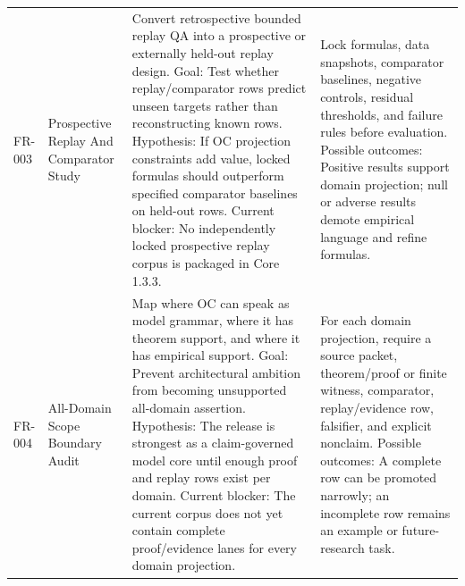 \begin{longtable}{@{}L{0.08\textwidth}L{0.19\textwidth}L{0.28\textwidth}L{0.31\textwidth}@{}}
FR-003 & Prospective Replay And Comparator Study & Convert retrospective bounded replay QA into a prospective or externally held-out replay design. Goal: Test whether replay/comparator rows predict unseen targets rather than reconstructing known rows. Hypothesis: If OC projection constraints add value, locked formulas should outperform specified comparator baselines on held-out rows. Current blocker: No independently locked prospective replay corpus is packaged in Core 1.3.3. & Lock formulas, data snapshots, comparator baselines, negative controls, residual thresholds, and failure rules before evaluation. Possible outcomes: Positive results support domain projection; null or adverse results demote empirical language and refine formulas. \\
FR-004 & All-Domain Scope Boundary Audit & Map where OC can speak as model grammar, where it has theorem support, and where it has empirical support. Goal: Prevent architectural ambition from becoming unsupported all-domain assertion. Hypothesis: The release is strongest as a claim-governed model core until enough proof and replay rows exist per domain. Current blocker: The current corpus does not yet contain complete proof/evidence lanes for every domain projection. & For each domain projection, require a source packet, theorem/proof or finite witness, comparator, replay/evidence row, falsifier, and explicit nonclaim. Possible outcomes: A complete row can be promoted narrowly; an incomplete row remains an example or future-research task. \\
\bottomrule
\end{longtable}
